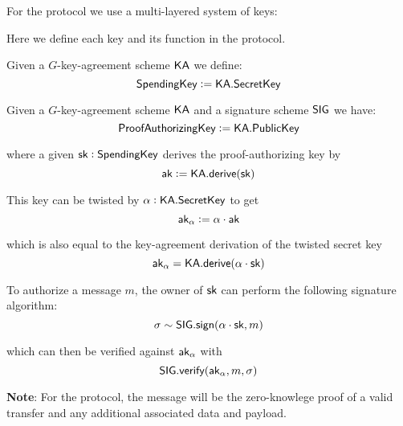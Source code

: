 
For the \Transfer{} protocol we use a multi-layered system of keys:

\begin{center}
    \vspace{1em}
    \begin{mdframed}[leftmargin=0.125\textwidth, rightmargin=0.125\textwidth]
        \begin{center}
        \end{center}
    \end{mdframed}
    \vspace{-1em}
\end{center}

Here we define each key and its function in the \Transfer{} protocol.

\begin{definition}
    Given a $G$-key-agreement scheme ${\textsf{KA}}$ we define:
    \[{\textsf{SpendingKey}} := {\textsf{KA}}.{\textsf{SecretKey}}\]
\end{definition}

\begin{definition}
    Given a $G$-key-agreement scheme ${\textsf{KA}}$ and a signature scheme ${\textsf{SIG}}$ we have:
    \[{\textsf{ProofAuthorizingKey}} := {\textsf{KA}}.{\textsf{PublicKey}}\]

    where a given ${\textsf{sk}} : {\textsf{SpendingKey}}$ derives the proof-authorizing key by
    \[{\textsf{ak}} := {\textsf{KA}}.{\textsf{derive}}({\textsf{sk}})\]

    This key can be twisted by $\alpha : {\textsf{KA}}.{\textsf{SecretKey}}$ to get
    \[{\textsf{ak}}_\alpha := \alpha \cdot {\textsf{ak}}\]

    which is also equal to the key-agreement derivation of the twisted secret key
    \[{\textsf{ak}}_\alpha = {\textsf{KA}}.{\textsf{derive}}(\alpha \cdot {\textsf{sk}})\]

    To authorize a message $m$, the owner of ${\textsf{sk}}$ can perform the following signature algorithm:
    \[\sigma \sim {\textsf{SIG}}.{\textsf{sign}}(\alpha \cdot {\textsf{sk}}, m)\]

    which can then be verified against ${\textsf{ak}}_\alpha$ with
    \[{\textsf{SIG}}.{\textsf{verify}}({\textsf{ak}}_\alpha, m, \sigma)\]

    \textbf{Note}: For the \Transfer{} protocol, the message will be the zero-knowlege proof of a valid transfer and any additional associated data and \Ledger{} payload.
\end{definition}

